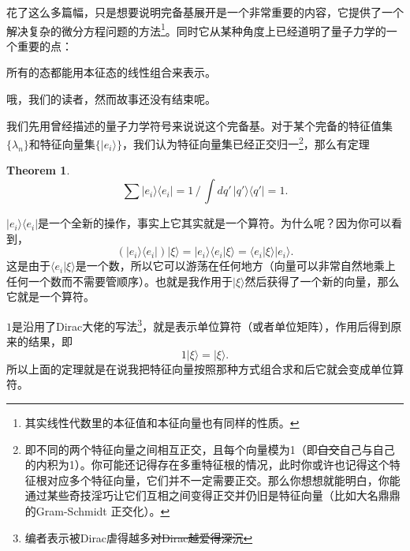 \documentclass[12pt,a4paper,openany,twoside]{book}
\newtheorem{theorem}{Theorem}[section]
\numberwithin{equation}{section}
\newcommand{\bra}[1]{\langle #1 |}
\newcommand{\ket}[1]{| #1 \rangle}
\begin{document}
    花了这么多篇幅，只是想要说明完备基展开是一个非常重要的内容，它提供了一个解决复杂的微分方程问题的方法\footnote{其实线性代数里的本征值和本征向量也有同样的性质。}。同时它从某种角度上已经道明了量子力学的一个重要的点：
    \begin{center}
    	所有的态都能用本征态的线性组合来表示。
    \end{center}

    哦，我们的读者，然而故事还没有结束呢。

    我们先用曾经描述的量子力学符号来说说这个完备基。对于某个完备的特征值集$\{\lambda_n\}$和特征向量集$\{| e_i \rangle \}$，我们认为特征向量集已经正交归一\footnote{即不同的两个特征向量之间相互正交，且每个向量模为1（即\sout{自交}自己与自己的内积为1）。你可能还记得存在多重特征根的情况，此时你或许也记得这个特征根对应多个特征向量，它们并不一定需要正交。那么你想想就能明白，你能通过某些奇技淫巧让它们互相之间变得正交并仍旧是特征向量（比如大名鼎鼎的Gram-Schmidt 正交化）。}，那么有定理
    \begin{theorem}
	\begin{equation}
		\sum \ket{e_i}\bra{e_i} = 1 \, / \, \int dq' \, \ket{q'}\bra{q'} = 1.
	\end{equation}
    \end{theorem}

    $| e_i \rangle \langle e_i | $是一个全新的操作，事实上它其实就是一个算符。为什么呢？因为你可以看到，
    \begin{equation}
      (| e_i \rangle \langle e_i | ) | \xi \rangle = | e_i \rangle \langle e_i | \xi \rangle = \langle e_i | \xi \rangle | e_i \rangle  .
      \label{ ket bra }
    \end{equation}
    这是由于$ \langle e_i | \xi \rangle $是一个数，所以它可以游荡在任何地方（向量可以非常自然地乘上任何一个数而不需要管顺序）。也就是我作用于$| \xi \rangle $然后获得了一个新的向量，那么它就是一个算符。

    $1$是沿用了Dirac大佬的写法\footnote{编者表示被Dirac虐得越多\sout{对Dirac越爱得深沉}}，就是表示单位算符（或者单位矩阵），作用后得到原来的结果，即
    \begin{equation}
    	1 | \xi \rangle = | \xi \rangle .
    \end{equation}
    所以上面的定理就是在说我把特征向量按照那种方式组合求和后它就会变成单位算符。
\end{document}
